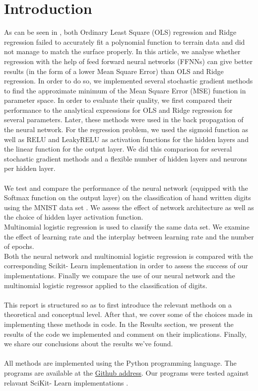 \documentclass[11pt,a4paper,titlepage]{article}
\begin{document}
\section{Introduction}
As can be seen in \citep{Project1}, both Ordinary Least Square (OLS) regression and  Ridge regression failed to accurately fit a polynomial function to terrain data and did not manage to match the surface properly. In this article, we analyse whether regression with the help of feed forward neural networks (FFNNs) can give better results (in the form of a lower Mean Square Error) than OLS and Ridge regression. In order to do so, we implemented several stochastic gradient methods to find the approximate minimum of the Mean Square Error (MSE) function in parameter space. In order to evaluate their quality, we first compared their performance to the analytical expressions for OLS and Ridge regression for several parameters. Later, these methods were used in the back propagation of the neural network. For the regression problem, we used the sigmoid function as well as RELU and LeakyRELU as activation functions for the hidden layers and the linear function for the output layer. We did this comparison for several stochastic gradient methods and a flexible number of hidden layers and neurons per hidden layer. \\\\We test and compare the performance of the neural network (equipped with the Softmax function on the output layer) on the classification of hand written digits using the MNIST data set \citep{lecun2010mnist}. We assess the effect of network architecture as well as the choice of hidden layer activation function.\\ Multinomial logistic regression is used to classify the same data set. We examine the effect of learning rate and the interplay between learning rate and the number of epochs.\\Both the neural network and multinomial logistic regression is compared with the corresponding Scikit- Learn implementation in order to assess the success of our implementations. Finally we compare the use of our neural network and the multinomial logistic regressor applied to the classification of digits.\\\\This report is structured so as to first introduce the relevant methods on a theoretical and conceptual level. After that, we cover some of the choices made in implementing these methods in code. In the Results section, we present the results of the code we implemented and comment on their implications. Finally, we share our conclusions about the results we've found.\\\\All methods are implemented using the Python programming language. The programs are available at the \href{https://github.com/schraderSimon/FYS-STK/tree/master/project2}{Github address}. Our programs were tested against relavant SciKit- Learn implementations \cite{scikit-learn}.
\end{document}
